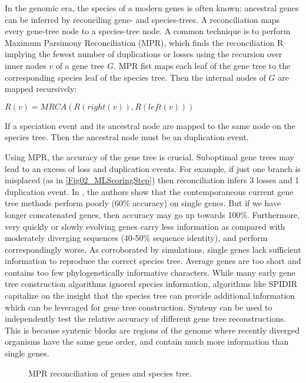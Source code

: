 In the genomic era, the species of a modern genes is often known;
ancestral genes can be inferred by reconciling gene- and
species-trees. A reconciliation maps every gene-tree node to a
species-tree node. A common technique is to perform Maximum Parsimony
Reconciliation (MPR), which finds the reconciliation R implying the
fewest number of duplications or losses using the recursion over inner
nodes $v$ of a gene tree $G$. MPR fist maps each leaf of the gene tree
to the corresponding species leaf of the species tree. Then the
internal nodes of $G$ are mapped recursively:

$R(v) = MRCA(R(right(v)),R(left(v)))$

\noindent If a speciation event and its ancestral node are mapped to the same node on the species tree. Then the ancestral node must be an duplication event.

Using MPR, the accuracy of the gene tree is crucial. Suboptimal gene
trees may lead to an excess of loss and duplication events. For
example, if just one branch is misplaced (as in
\ref{Fig02_MLScoringStep}) then reconciliation infers 3 losses and 1
duplication event. In \cite{Rasmussen}, the authors show that the
contemporaneous current gene tree methods perform poorly (60\%
accuracy) on single genes. But if we have longer concatenated genes,
then accuracy may go up towards 100\%. Furthermore, very quickly or
slowly evolving genes carry less information as compared with
moderately diverging sequences (40-50\% sequence identity), and
perform correspondingly worse. As corroborated by simulations, single
genes lack sufficient information to reproduce the correct species
tree. Average genes are too short and contains too few
phylogenetically informative characters. While many early gene tree
construction algorithms ignored species information, algorithms like
SPIDIR capitalize on the insight that the species tree can provide
additional information which can be leveraged for gene tree
construction. Synteny can be used to independently test the relative
accuracy of different gene tree reconstructions. This is because
syntenic blocks are regions of the genome where recently diverged
organisms have the same gene order, and contain much more information
than single genes.

\begin{figure} [ht!] 
  \centering 
  \caption{MPR reconciliation of genes and species tree.}
  \label{Fig18_AlternateReconciliations}
\end{figure} 

